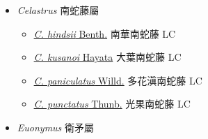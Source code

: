 
  \begin{itemize}
 \item[] \textit{Celastrus} 南蛇藤屬
                    
  \begin{itemize}
        \item[] \href{http://www.theplantlist.org/tpl1.1/search?q=Celastrus+hindsii}{\textit{C. hindsii} Benth.}   南華南蛇藤 LC
        \item[] \href{http://www.theplantlist.org/tpl1.1/search?q=Celastrus+kusanoi}{\textit{C. kusanoi} Hayata}   大葉南蛇藤 LC
        \item[] \href{http://www.theplantlist.org/tpl1.1/search?q=Celastrus+paniculatus}{\textit{C. paniculatus} Willd.}   多花滇南蛇藤 LC
        \item[] \href{http://www.theplantlist.org/tpl1.1/search?q=Celastrus+punctatus}{\textit{C. punctatus} Thunb.}   光果南蛇藤 LC
  \end{itemize}
 \item[] \textit{Euonymus} 衛矛屬
                    

\end{itemize}
